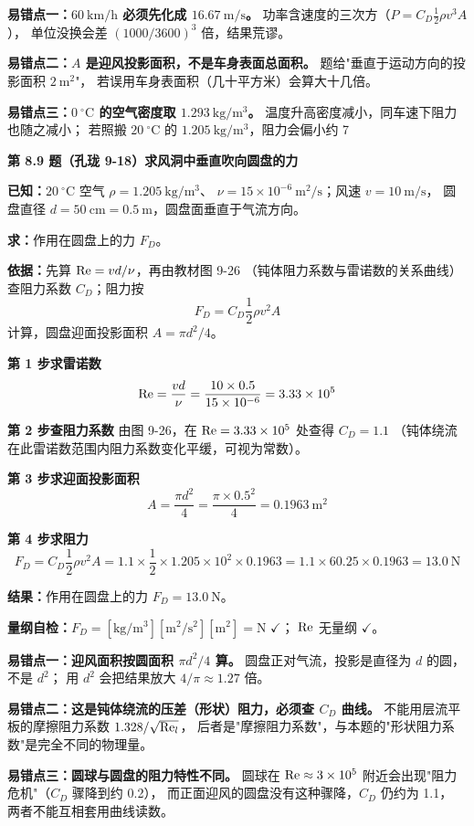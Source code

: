 \begin{yicuo}
\textbf{易错点一：$60\ \mathrm{km/h}$ 必须先化成 $16.67\ \mathrm{m/s}$。}
功率含速度的三次方（$P=C_D\frac{1}{2}\rho v^{3}A$），
单位没换会差 $(1000/3600)^{3}$ 倍，结果荒谬。

\textbf{易错点二：$A$ 是迎风投影面积，不是车身表面总面积。}
题给"垂直于运动方向的投影面积 $2\ \mathrm{m^2}$"，
若误用车身表面积（几十平方米）会算大十几倍。

\textbf{易错点三：$0\ ^{\circ}\mathrm{C}$ 的空气密度取 $1.293\ \mathrm{kg/m^3}$。}
温度升高密度减小，同车速下阻力也随之减小；
若照搬 $20\ ^{\circ}\mathrm{C}$ 的 $1.205\ \mathrm{kg/m^3}$，阻力会偏小约 7%
\end{yicuo}

\noindent\textbf{第 8.9 题（孔珑 9-18）\quad 求风洞中垂直吹向圆盘的力}

\begin{jie}
\textbf{已知：}$20\ ^{\circ}\mathrm{C}$ 空气 $\rho=1.205\ \mathrm{kg/m^3}$、
$\nu=15\times10^{-6}\ \mathrm{m^2/s}$；风速 $v=10\ \mathrm{m/s}$，
圆盘直径 $d=50\ \mathrm{cm}=0.5\ \mathrm{m}$，圆盘面垂直于气流方向。

\textbf{求：}作用在圆盘上的力 $F_D$。

\textbf{依据：}先算 $\mathrm{Re}=vd/\nu$，再由教材图 9-26
（钝体阻力系数与雷诺数的关系曲线）查阻力系数 $C_D$；阻力按
\[ F_D=C_D\frac{1}{2}\rho v^{2}A \]
计算，圆盘迎面投影面积 $A=\pi d^{2}/4$。

\textbf{第 1 步\quad 求雷诺数}
\[ \mathrm{Re}=\frac{vd}{\nu}=\frac{10\times0.5}{15\times10^{-6}}=3.33\times10^{5} \]

\textbf{第 2 步\quad 查阻力系数}
由图 9-26，在 $\mathrm{Re}=3.33\times10^{5}$ 处查得 $C_D=1.1$
（钝体绕流在此雷诺数范围内阻力系数变化平缓，可视为常数）。

\textbf{第 3 步\quad 求迎面投影面积}
\[ A=\frac{\pi d^{2}}{4}=\frac{\pi\times0.5^{2}}{4}=0.1963\ \mathrm{m^2} \]

\textbf{第 4 步\quad 求阻力}
\[ F_D=C_D\frac{1}{2}\rho v^{2}A=1.1\times\frac{1}{2}\times1.205\times10^{2}\times0.1963
=1.1\times60.25\times0.1963=13.0\ \mathrm{N} \]

\textbf{结果：}作用在圆盘上的力 $F_D=13.0\ \mathrm{N}$。

\textbf{量纲自检：}$F_D=[\mathrm{kg/m^3}][\mathrm{m^2/s^2}][\mathrm{m^2}]=\mathrm{N}$ $\checkmark$；
$\mathrm{Re}$ 无量纲 $\checkmark$。
\end{jie}

\begin{yicuo}
\textbf{易错点一：迎风面积按圆面积 $\pi d^{2}/4$ 算。}
圆盘正对气流，投影是直径为 $d$ 的圆，不是 $d^{2}$；
用 $d^{2}$ 会把结果放大 $4/\pi\approx1.27$ 倍。

\textbf{易错点二：这是钝体绕流的压差（形状）阻力，必须查 $C_D$ 曲线。}
不能用层流平板的摩擦阻力系数 $1.328/\sqrt{\mathrm{Re}_l}$，
后者是"摩擦阻力系数"，与本题的"形状阻力系数"是完全不同的物理量。

\textbf{易错点三：圆球与圆盘的阻力特性不同。}
圆球在 $\mathrm{Re}\approx3\times10^{5}$ 附近会出现"阻力危机"（$C_D$ 骤降到约 0.2），
而正面迎风的圆盘没有这种骤降，$C_D$ 仍约为 1.1，
两者不能互相套用曲线读数。
\end{yicuo}

